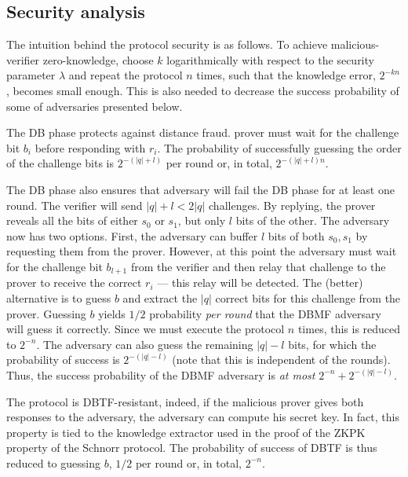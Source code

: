 \subsection{Security analysis}

The intuition behind the protocol security is as follows.
To achieve malicious-verifier zero-knowledge, choose \(k\) logarithmically with 
respect to the security parameter \(\lambda\) and repeat the protocol \(n\) 
times, such that the knowledge error, \(2^{-kn}\), becomes small enough.
This is also needed to decrease the success probability of some of adversaries 
presented below.

The \ac{DB} phase protects against distance fraud.
 prover must wait for the challenge bit \(b_i\) before responding 
with \(r_i\).
The probability of successfully guessing the order of the challenge bits is 
\(2^{-(|q|+l)}\) per round or, in total, \(2^{-(|q|+l)n}\).

The \ac{DB} phase also ensures that  adversary will fail the \ac{DB} 
phase for at least one round.
The verifier will send \(|q| + l < 2|q|\) challenges.
By replying, the prover reveals all the bits of either \(s_0\) or \(s_1\), but 
only \(l\) bits of the other.
The adversary now has two options.
First, the adversary can buffer \(l\) bits of both \(s_0, s_1\) by requesting 
them from the prover.
However, at this point the adversary must wait for the challenge bit 
\(b_{l+1}\) from the verifier and then relay that challenge to the prover to 
receive the correct \(r_i\) --- this relay will be detected.
The (better) alternative is to guess \(b\) and extract the \(|q|\) correct bits 
for this challenge from the prover.
Guessing \(b\) yields \(1/2\) probability \emph{per round} that the \ac{DBMF} 
adversary will guess it correctly.
Since we must execute the protocol \(n\) times, this is reduced to \(2^{-n}\).
The adversary can also guess the remaining \(|q|-l\) bits, for which the 
probability of success is \(2^{-(|q|-l)}\) (note that this is independent of 
the rounds).
Thus, the success probability of the \ac{DBMF} adversary is \emph{at most} 
\(2^{-n}+2^{-(|q|-l)}\).


The protocol is \ac{DBTF}-resistant, indeed, if the malicious prover gives both 
responses to the adversary, the adversary can compute his secret key.
In fact, this property is tied to the knowledge extractor used in the proof of 
the \ac{ZKPK} property of the Schnorr protocol.
The probability of success of \ac{DBTF} is thus reduced to guessing \(b\), \ie 
\(1/2\) per round or, in total, \(2^{-n}\).

